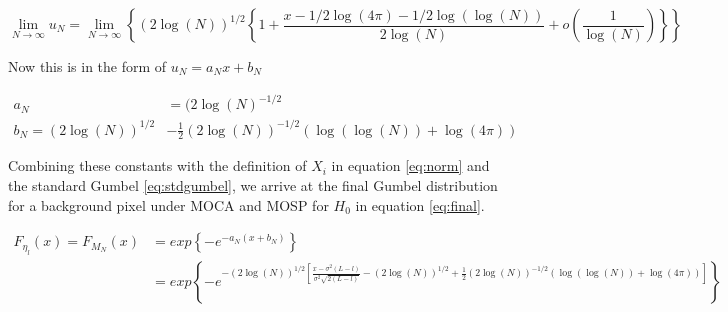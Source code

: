 \documentclass[paper=a4, fontsize=11pt]{article} %
\begin{document}
\begin{equation}
\lim_{N\rightarrow\infty}u_N = \lim_{N\rightarrow\infty}\left\{(2\log(N))^{1/2}\left\{1 + \frac{x-1/2\log(4\pi)-1/2\log(\log(N))}{2\log(N)} + o\left(\frac{1}{\log(N)}\right)\right\}\right\}
\end{equation}

Now this is in the form of \(u_N = a_N x + b_N\)

\begin{align}
a_N &= (2\log(N)^{-1/2} \\
b_N = (2\log(N))^{1/2} &- \frac{1}{2}(2\log(N))^{-1/2}(\log(\log(N)) + \log(4\pi))
\end{align}

Combining these constants with the definition of \(X_i\) in equation \ref{eq:norm} and the standard Gumbel \ref{eq:stdgumbel}, we arrive at the final Gumbel distribution for a background pixel under MOCA and MOSP for \(H_0\) in equation \ref{eq:final}.

\begin{align}
\label{eq:final}
F_{\eta_l}(x) = F_{M_N}(x) &= exp\left\{-e^{-a_N(x + b_N)}\right\} \\
 &= exp\left\{-e^{-(2\log(N))^{1/2}\left[\frac{x-\sigma^2(L-l)}{\sigma^2\sqrt{2(L-l)}} - (2\log(N))^{1/2} + \frac{1}{2}(2\log(N))^{-1/2}(\log(\log(N)) + \log(4\pi))\right]}\right\}
\end{align}

\nocite{*}


\end{document}
